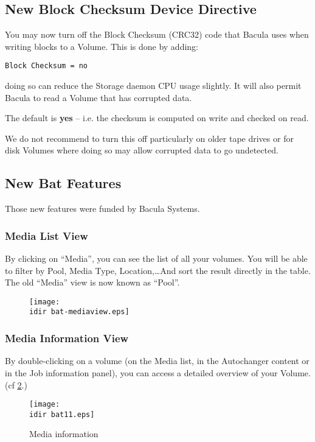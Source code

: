 \subsection{New {\bf Block Checksum} Device Directive}
You may now turn off the Block Checksum (CRC32) code
that Bacula uses when writing blocks to a Volume.  This is
done by adding:

\begin{verbatim}
Block Checksum = no
\end{verbatim}

doing so can reduce the Storage daemon CPU usage slightly.  It
will also permit Bacula to read a Volume that has corrupted data.

The default is {\bf yes} -- i.e. the checksum is computed on write
and checked on read. 

We do not recommend to turn this off particularly on older tape
drives or for disk Volumes where doing so may allow corrupted data
to go undetected.

\subsection{New Bat Features}

Those new features were funded by Bacula Systems.

\subsubsection{Media List View}

By clicking on ``Media'', you can see the list of all your volumes. You will be
able to filter by Pool, Media Type, Location,\dots And sort the result directly
in the table. The old ``Media'' view is now known as ``Pool''.
\begin{figure}[htbp]
  \centering
  \texttt{[image: \\idir bat-mediaview.eps]}
  \label{fig:mediaview}
\end{figure}


\subsubsection{Media Information View}

By double-clicking on a volume (on the Media list, in the Autochanger content
or in the Job information panel), you can access a detailed overview of your
Volume. (cf \ref{fig:mediainfo}.)
\begin{figure}[htbp]
  \centering
  \texttt{[image: \\idir bat11.eps]}  
  \caption{Media information}
  \label{fig:mediainfo}
\end{figure}

